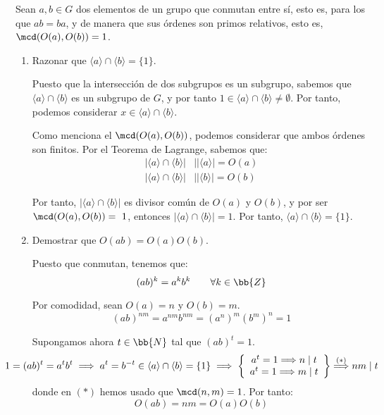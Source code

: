 \begin{ejercicio}\label{ej:3.5}
    Sean $a, b \in G$ dos elementos de un grupo que conmutan entre sí, esto es, para los que $ab = ba$, y de manera que sus órdenes son primos relativos, esto es, $\mcd(O(a), O(b)) = 1$.
    \begin{enumerate}
        \item Razonar que $\langle a \rangle \cap \langle b \rangle = \{1\}$.
        
        Puesto que la intersección de dos subgrupos es un subgrupo, sabemos que $\langle a\rangle\cap\langle b\rangle$ es un subgrupo de $G$, y por tanto $1\in \langle a\rangle\cap\langle b\rangle\neq \emptyset$. Por tanto, podemos considerar $x\in \langle a\rangle\cap\langle b\rangle$.

        Como menciona el $\mcd(O(a),O(b))$, podemos considerar que ambos órdenes son finitos. Por el Teorema de Lagrange, sabemos que:
        \begin{align*}
            |\langle a\rangle\cap \langle b\rangle|&\mid |\langle a\rangle|=O(a)\\
            |\langle a\rangle\cap \langle b\rangle|&\mid |\langle b\rangle|=O(b)
        \end{align*}

        Por tanto, $|\langle a\rangle\cap \langle b\rangle|$ es divisor común de $O(a)$ y $O(b)$, y por ser $\mcd(O(a),O(b))=~1$, entonces $|\langle a\rangle\cap \langle b\rangle|=1$. Por tanto, $\langle a\rangle\cap \langle b\rangle=\{1\}$.

        \item Demostrar que $O(ab) = O(a)O(b)$.
        
        Puesto que conmutan, tenemos que:
        \begin{equation*}
            (ab)^k=a^kb^k\qquad \forall k\in\bb{Z}
        \end{equation*}

        Por comodidad, sean $O(a)=n$ y $O(b)=m$.
        \begin{equation*}
            (ab)^{nm}=a^{nm}b^{nm}=(a^n)^m(b^m)^n=1
        \end{equation*}

        Supongamos ahora $t\in \bb{N}$ tal que $(ab)^t=1$. 
        \begin{equation*}
            \hspace{-1cm}1=(ab)^t=a^tb^t\implies a^t=b^{-t}\in \langle a\rangle\cap \langle b\rangle=\{1\}\implies \left\{\begin{array}{c}
                a^t=1\Longrightarrow n\mid t\\
                a^t=1\Longrightarrow m\mid t
            \end{array}\right\}\stackrel{(\ast)}{\Longrightarrow} nm\mid t
        \end{equation*}
        donde en $(\ast)$ hemos usado que $\mcd(n,m)=1$. Por tanto:
        \begin{equation*}
            O(ab)=nm=O(a)O(b)
        \end{equation*}
    \end{enumerate}
\end{ejercicio}

